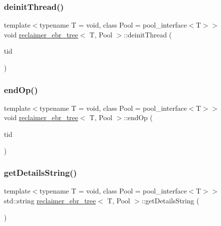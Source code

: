 \mbox{\label{classreclaimer__ebr__tree_aa38c8b0f0fa033a35dd8f9af80ddd4a7}} 
\subsubsection{\texorpdfstring{deinit\+Thread()}{deinitThread()}}
{\footnotesize\ttfamily template$<$typename T  = void, class Pool  = pool\+\_\+interface$<$\+T$>$$>$ \\
void \hyperlink{classreclaimer__ebr__tree}{reclaimer\+\_\+ebr\+\_\+tree}$<$ T, Pool $>$\+::deinit\+Thread (\begin{DoxyParamCaption}\item[{const int}]{tid }\end{DoxyParamCaption})\hspace{0.3cm}{\ttfamily [inline]}}

\mbox{\label{classreclaimer__ebr__tree_abba75a9a4c5b57f3865dab1b7a79a873}} 
\subsubsection{\texorpdfstring{end\+Op()}{endOp()}}
{\footnotesize\ttfamily template$<$typename T  = void, class Pool  = pool\+\_\+interface$<$\+T$>$$>$ \\
void \hyperlink{classreclaimer__ebr__tree}{reclaimer\+\_\+ebr\+\_\+tree}$<$ T, Pool $>$\+::end\+Op (\begin{DoxyParamCaption}\item[{const int}]{tid }\end{DoxyParamCaption})\hspace{0.3cm}{\ttfamily [inline]}}

\mbox{\label{classreclaimer__ebr__tree_a8e199d1bf0d466f1317f7d637a6c427f}} 
\subsubsection{\texorpdfstring{get\+Details\+String()}{getDetailsString()}}
{\footnotesize\ttfamily template$<$typename T  = void, class Pool  = pool\+\_\+interface$<$\+T$>$$>$ \\
std\+::string \hyperlink{classreclaimer__ebr__tree}{reclaimer\+\_\+ebr\+\_\+tree}$<$ T, Pool $>$\+::get\+Details\+String (\begin{DoxyParamCaption}{ }\end{DoxyParamCaption})\hspace{0.3cm}{\ttfamily [inline]}}

